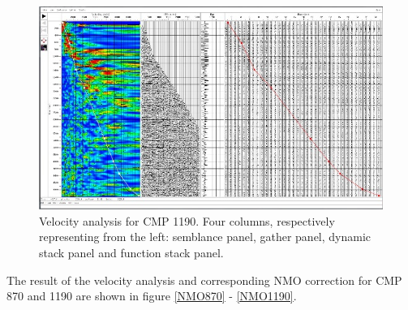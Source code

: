 \documentclass[10pt,a4paper]{article}
\begin{document}
\begin{figure}[H]
\includegraphics[width=\textwidth]{Velo_anal_1190.jpg}
\caption{Velocity analysis for CMP 1190. Four columns, respectively representing from the left: semblance panel, gather panel, dynamic stack panel and function stack panel.}
\label{VA1190}
\end{figure}

\noindent The result of the velocity analysis and corresponding NMO correction for CMP 870 and 1190 are shown in figure \ref{NMO870} - \ref{NMO1190}.
\end{document}
